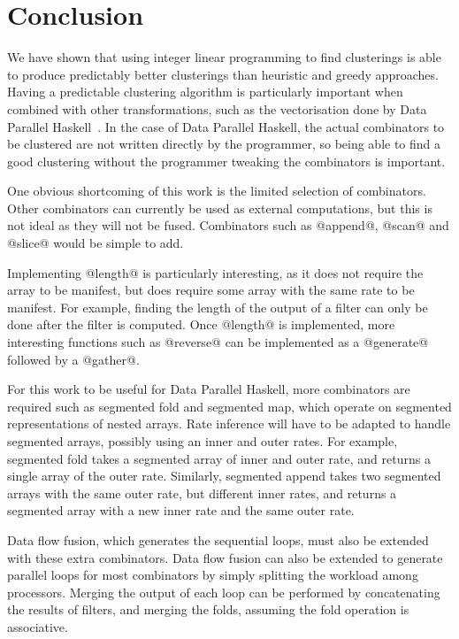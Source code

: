 

\chapter{Conclusion}
We have shown that using integer linear programming to find clusterings is able to produce predictably better clusterings than heuristic and greedy approaches.
Having a predictable clustering algorithm is particularly important when combined with other transformations, such as the vectorisation done by Data Parallel Haskell~\cite{chakravarty2007data}.
In the case of Data Parallel Haskell, the actual combinators to be clustered are not written directly by the programmer, so being able to find a good clustering without the programmer tweaking the combinators is important.

One obvious shortcoming of this work is the limited selection of combinators.
Other combinators can currently be used as external computations, but this is not ideal as they will not be fused.
Combinators such as @append@, @scan@ and @slice@ would be simple to add.

Implementing @length@ is particularly interesting, as it does not require the array to be manifest, but does require some array with the same rate to be manifest.
For example, finding the length of the output of a filter can only be done after the filter is computed.
Once @length@ is implemented, more interesting functions such as @reverse@ can be implemented as a @generate@ followed by a @gather@.

For this work to be useful for Data Parallel Haskell, more combinators are required such as segmented fold and segmented map, which operate on segmented representations of nested arrays.
Rate inference will have to be adapted to handle segmented arrays, possibly using an inner and outer rates.
For example, segmented fold takes a segmented array of inner and outer rate, and returns a single array of the outer rate.
Similarly, segmented append takes two segmented arrays with the same outer rate, but different inner rates, and returns a segmented array with a new inner rate and the same outer rate.

Data flow fusion, which generates the sequential loops, must also be extended with these extra combinators.
Data flow fusion can also be extended to generate parallel loops for most combinators by simply splitting the workload among processors.
Merging the output of each loop can be performed by concatenating the results of filters, and merging the folds, assuming the fold operation is associative.


